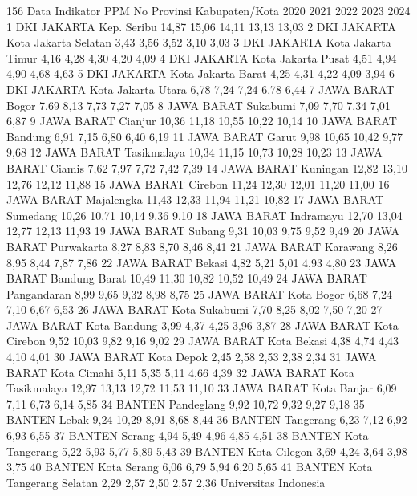 156
Data Indikator PPM
No Provinsi Kabupaten/Kota 2020 2021 2022 2023 2024
1 DKI JAKARTA Kep. Seribu 14,87 15,06 14,11 13,13 13,03
2 DKI JAKARTA Kota Jakarta Selatan 3,43 3,56 3,52 3,10 3,03
3 DKI JAKARTA Kota Jakarta Timur 4,16 4,28 4,30 4,20 4,09
4 DKI JAKARTA Kota Jakarta Pusat 4,51 4,94 4,90 4,68 4,63
5 DKI JAKARTA Kota Jakarta Barat 4,25 4,31 4,22 4,09 3,94
6 DKI JAKARTA Kota Jakarta Utara 6,78 7,24 7,24 6,78 6,44
7 JAWA BARAT Bogor 7,69 8,13 7,73 7,27 7,05
8 JAWA BARAT Sukabumi 7,09 7,70 7,34 7,01 6,87
9 JAWA BARAT Cianjur 10,36 11,18 10,55 10,22 10,14
10 JAWA BARAT Bandung 6,91 7,15 6,80 6,40 6,19
11 JAWA BARAT Garut 9,98 10,65 10,42 9,77 9,68
12 JAWA BARAT Tasikmalaya 10,34 11,15 10,73 10,28 10,23
13 JAWA BARAT Ciamis 7,62 7,97 7,72 7,42 7,39
14 JAWA BARAT Kuningan 12,82 13,10 12,76 12,12 11,88
15 JAWA BARAT Cirebon 11,24 12,30 12,01 11,20 11,00
16 JAWA BARAT Majalengka 11,43 12,33 11,94 11,21 10,82
17 JAWA BARAT Sumedang 10,26 10,71 10,14 9,36 9,10
18 JAWA BARAT Indramayu 12,70 13,04 12,77 12,13 11,93
19 JAWA BARAT Subang 9,31 10,03 9,75 9,52 9,49
20 JAWA BARAT Purwakarta 8,27 8,83 8,70 8,46 8,41
21 JAWA BARAT Karawang 8,26 8,95 8,44 7,87 7,86
22 JAWA BARAT Bekasi 4,82 5,21 5,01 4,93 4,80
23 JAWA BARAT Bandung Barat 10,49 11,30 10,82 10,52 10,49
24 JAWA BARAT Pangandaran 8,99 9,65 9,32 8,98 8,75
25 JAWA BARAT Kota Bogor 6,68 7,24 7,10 6,67 6,53
26 JAWA BARAT Kota Sukabumi 7,70 8,25 8,02 7,50 7,20
27 JAWA BARAT Kota Bandung 3,99 4,37 4,25 3,96 3,87
28 JAWA BARAT Kota Cirebon 9,52 10,03 9,82 9,16 9,02
29 JAWA BARAT Kota Bekasi 4,38 4,74 4,43 4,10 4,01
30 JAWA BARAT Kota Depok 2,45 2,58 2,53 2,38 2,34
31 JAWA BARAT Kota Cimahi 5,11 5,35 5,11 4,66 4,39
32 JAWA BARAT Kota Tasikmalaya 12,97 13,13 12,72 11,53 11,10
33 JAWA BARAT Kota Banjar 6,09 7,11 6,73 6,14 5,85
34 BANTEN Pandeglang 9,92 10,72 9,32 9,27 9,18
35 BANTEN Lebak 9,24 10,29 8,91 8,68 8,44
36 BANTEN Tangerang 6,23 7,12 6,92 6,93 6,55
37 BANTEN Serang 4,94 5,49 4,96 4,85 4,51
38 BANTEN Kota Tangerang 5,22 5,93 5,77 5,89 5,43
39 BANTEN Kota Cilegon 3,69 4,24 3,64 3,98 3,75
40 BANTEN Kota Serang 6,06 6,79 5,94 6,20 5,65
41 BANTEN Kota Tangerang Selatan 2,29 2,57 2,50 2,57 2,36
Universitas Indonesia

